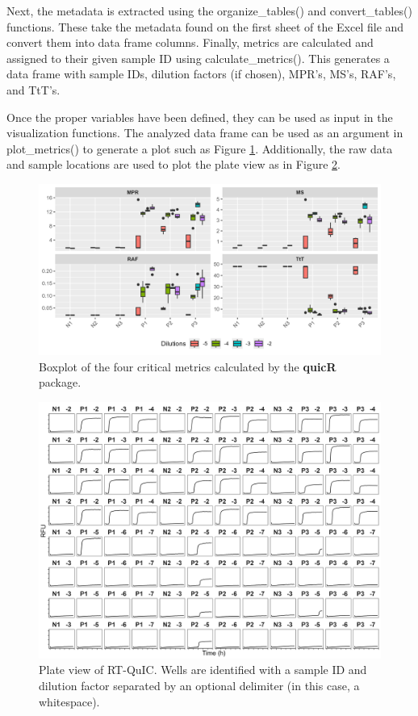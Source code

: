 \documentclass[preprint,12pt,a4paper]{elsarticle}
\begin{document}
            Next, the metadata is extracted using the organize\_tables() and convert\_tables() functions. These take the metadata found on the first sheet of the Excel file and convert them into data frame columns. Finally, metrics are calculated and assigned to their given sample ID using calculate\_metrics(). This generates a data frame with sample IDs, dilution factors (if chosen), MPR's, MS's, RAF's, and TtT's.

            Once the proper variables have been defined, they can be used as input in the visualization functions. The analyzed data frame can be used as an argument in plot\_metrics() to generate a plot such as Figure \ref{fig:boxplot}. Additionally, the raw data and sample locations are used to plot the plate view as in Figure \ref{fig:plateview}.

            \begin{figure}[ht]
                \centering
                \includegraphics[width=\textwidth]{images/boxplot.png}
                \caption{Boxplot of the four critical metrics calculated by the \textbf{quicR} package.}
                \label{fig:boxplot}
            \end{figure}

            \begin{figure}[ht]
                \centering
                \includegraphics[width=\textwidth]{images/plate_view.png}
                \caption{Plate view of RT-QuIC. Wells are identified with a sample ID and dilution factor separated by an optional delimiter (in this case, a whitespace).}
                \label{fig:plateview}
            \end{figure}
            
\end{document}
